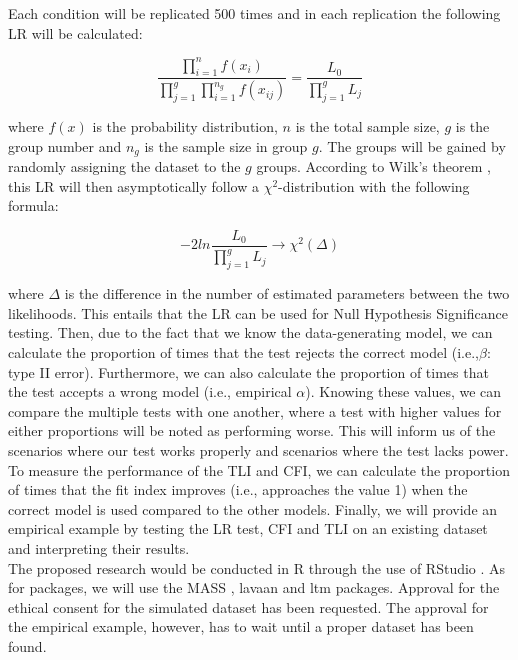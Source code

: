 \documentclass{article}
\begin{document}
Each condition will be replicated 500 times and in each replication the following LR will be calculated:

\begin{equation}
\frac{\prod_{i=1}^n f(x_i)}{\prod_{j=1}^g\prod_{i=1}^{n_g} f(x_{ij})} = \frac{L_0}{\prod_{j = 1}^g L_j}
\end{equation}

where $f(x)$ is the probability distribution, $n$ is the total sample size, $g$ is the group number and $n_g$ is the sample size in group $g$. The groups will be gained by randomly assigning the dataset to the $g$ groups. According to Wilk's theorem \autocite{wilkth}, this LR will then asymptotically follow a $\chi^2$-distribution with the following formula:

\begin{equation}
- 2ln\frac{L_0}{\prod_{j = 1}^g L_j} \rightarrow \chi^{2}(\Delta)
\end{equation}

where $\Delta$ is the difference in the number of estimated parameters between the two likelihoods. This entails that the LR can be used for Null Hypothesis Significance testing. Then, due to the fact that we know the data-generating model, we can calculate the proportion of times that the test rejects the correct model (i.e.,$\beta$: type II error). Furthermore, we can also calculate the proportion of times that the test accepts a wrong model (i.e., empirical $\alpha$). Knowing these values, we can compare the multiple tests with one another, where a test with higher values for either proportions will be noted as performing worse. This will inform us of the scenarios where our test works properly and scenarios where the test lacks power. 
To measure the performance of the TLI and CFI, we can calculate the proportion of times that the fit index improves (i.e., approaches the value 1) when the correct model is used compared to the other models. Finally, we will provide an empirical example by testing the LR test, CFI and TLI on an existing dataset and interpreting their results. \\
\indent The proposed research would be conducted in R \autocite{R} through the use of RStudio \autocite{Rstudio}. As for packages, we will use the MASS \autocite{mass}, lavaan \autocite{lavaan} and ltm \autocite{ltmpack} packages. Approval for the ethical consent for the simulated dataset has been requested. The approval for the empirical example, however, has to wait until a proper dataset has been found.


\nocite{*}

\newpage
\printbibliography
\end{document}
